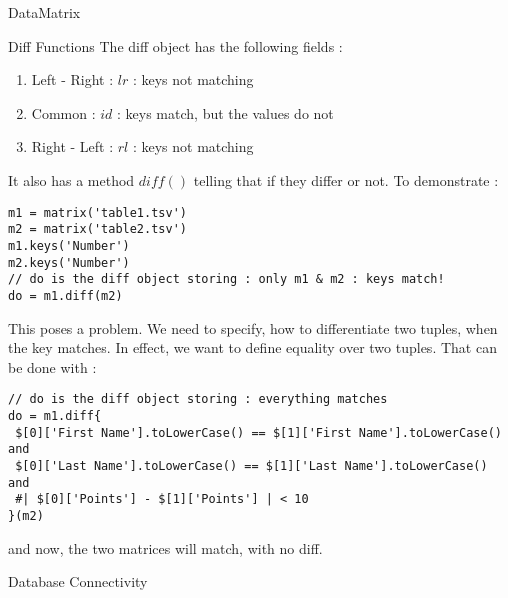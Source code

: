 \begin{section}{DataMatrix}
\begin{subsection}{Diff Functions}
The diff object has the following fields :
\begin{enumerate}
\item{Left - Right : $lr$ : keys not matching }
\item{Common : $id$ : keys match, but the values do not}
\item{Right - Left : $rl$ : keys not matching }
\end{enumerate}
It also has a method $diff()$ telling that if they differ or not. 
To demonstrate :

\begin{lstlisting}[style=JexlStyle]
m1 = matrix('table1.tsv')
m2 = matrix('table2.tsv')
m1.keys('Number')
m2.keys('Number')
// do is the diff object storing : only m1 & m2 : keys match! 
do = m1.diff(m2)
\end{lstlisting}

This poses a problem. We need to specify, how to differentiate two tuples, 
when the key matches. In effect, we want to define equality over two tuples.
That can be done with :

\begin{lstlisting}[style=JexlStyle]
// do is the diff object storing : everything matches 
do = m1.diff{    
 $[0]['First Name'].toLowerCase() == $[1]['First Name'].toLowerCase() and 
 $[0]['Last Name'].toLowerCase() == $[1]['Last Name'].toLowerCase() and 
 #| $[0]['Points'] - $[1]['Points'] | < 10   
}(m2)
\end{lstlisting}
and now, the two matrices will match, with no diff.


\end{subsection}


\end{section}

\begin{section}{Database Connectivity}
\end{section}
